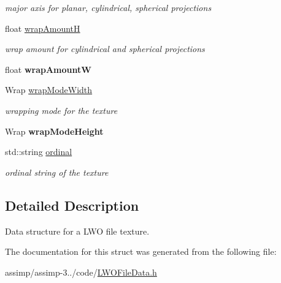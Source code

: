 \begin{DoxyCompactItemize}
\begin{DoxyCompactList}\small\item\em major axis for planar, cylindrical, spherical projections \end{DoxyCompactList}\item 
\hypertarget{struct_assimp_1_1_l_w_o_1_1_texture_ad52fd0b6fa37b54a2ef27677ef662b40}{float \hyperlink{struct_assimp_1_1_l_w_o_1_1_texture_ad52fd0b6fa37b54a2ef27677ef662b40}{wrap\+Amount\+H}}\label{struct_assimp_1_1_l_w_o_1_1_texture_ad52fd0b6fa37b54a2ef27677ef662b40}

\begin{DoxyCompactList}\small\item\em wrap amount for cylindrical and spherical projections \end{DoxyCompactList}\item 
\hypertarget{struct_assimp_1_1_l_w_o_1_1_texture_af60a9558d064d441b7dd7fb2e9f2cc9c}{float {\bfseries wrap\+Amount\+W}}\label{struct_assimp_1_1_l_w_o_1_1_texture_af60a9558d064d441b7dd7fb2e9f2cc9c}

\item 
\hypertarget{struct_assimp_1_1_l_w_o_1_1_texture_aae5ebf283250e26ce9320bd3c3657adc}{Wrap \hyperlink{struct_assimp_1_1_l_w_o_1_1_texture_aae5ebf283250e26ce9320bd3c3657adc}{wrap\+Mode\+Width}}\label{struct_assimp_1_1_l_w_o_1_1_texture_aae5ebf283250e26ce9320bd3c3657adc}

\begin{DoxyCompactList}\small\item\em wrapping mode for the texture \end{DoxyCompactList}\item 
\hypertarget{struct_assimp_1_1_l_w_o_1_1_texture_ae8a912b721bf087ccec92c1924c737d6}{Wrap {\bfseries wrap\+Mode\+Height}}\label{struct_assimp_1_1_l_w_o_1_1_texture_ae8a912b721bf087ccec92c1924c737d6}

\item 
\hypertarget{struct_assimp_1_1_l_w_o_1_1_texture_a74c797fd4105d05a3c77d3d68ae71001}{std\+::string \hyperlink{struct_assimp_1_1_l_w_o_1_1_texture_a74c797fd4105d05a3c77d3d68ae71001}{ordinal}}\label{struct_assimp_1_1_l_w_o_1_1_texture_a74c797fd4105d05a3c77d3d68ae71001}

\begin{DoxyCompactList}\small\item\em ordinal string of the texture \end{DoxyCompactList}\end{DoxyCompactItemize}


\subsection{Detailed Description}
Data structure for a L\+W\+O file texture. 

The documentation for this struct was generated from the following file\+:\begin{DoxyCompactItemize}
\item 
assimp/assimp-\/3../code/\hyperlink{_l_w_o_file_data_8h}{L\+W\+O\+File\+Data.\+h}\end{DoxyCompactItemize}
